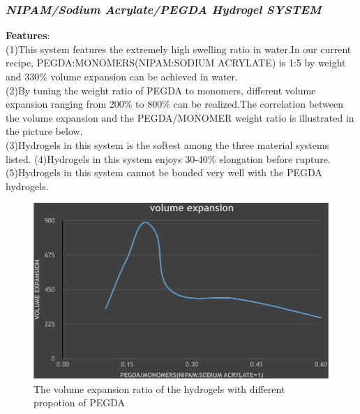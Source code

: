 \documentclass[a4paper]{article}
\begin{document}
\begin{itemize}
  \subsubsection{\textit{NIPAM/Sodium Acrylate/PEGDA Hydrogel SYSTEM}}
  \textbf{Features}:\\
  (1)This system features the extremely high swelling ratio in water.In our current recipe, PEGDA:MONOMERS(NIPAM:SODIUM 
  ACRYLATE) is 1:5 by weight and 330\% volume expansion can be achieved in water.\\
  (2)By tuning the weight ratio of PEGDA to monomers, different volume expansion ranging from 200\% to 800\% can be 
  realized.The correlation between the volume expansion and the PEGDA/MONOMER weight ratio is illustrated in the 
  picture below.\\
  (3)Hydrogels in this system is the softest among the three material systems listed.
  (4)Hydrogels in this system enjoys 30-40\% elongation before rupture.
  (5)Hydrogels in this system cannot be bonded very well with the PEGDA hydrogels.
  \begin{figure}
    \centering
    \includegraphics[width=400pt]{graph.png}
    \caption{The volume expansion ratio of the hydrogels with different propotion of PEGDA}
  \end{figure}
  \\



\end{itemize}
\end{document}
